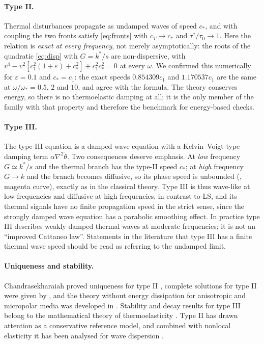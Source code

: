 \paragraph{Type II.} Thermal disturbances propagate as undamped waves of speed $c_*$, and with coupling the two fronts satisfy \eqref{eq:fronts} with $c_T\to c_*$ and $\tau^\dagger/\tau_0\to1$. Here the relation is \emph{exact at every frequency}, not merely asymptotically: the roots of the quadratic \eqref{eq:disp} with $G=k^*/s$ are non-dispersive, with $v^4-v^2[c_1^2(1+\varepsilon)+c_*^2]+c_1^2c_*^2=0$ at every $\omega$. We confirmed this numerically for $\varepsilon=0.1$ and $c_*=c_1$: the exact speeds $0.854309c_1$ and $1.170537c_1$ are the same at $\omega/\omega_*=0.5$, $2$ and $10$, and agree with the formula. The theory conserves energy, so there is no thermoelastic damping at all; it is the only member of the family with that property and therefore the benchmark for energy-based checks.
\paragraph{Type III.} The type III equation is a damped wave equation with a Kelvin--Voigt-type damping term $\alpha\nabla^2\dot\theta$. Two consequences deserve emphasis. At \emph{low} frequency $G\simeq k^*/s$ and the thermal branch has the type-II speed $c_*$; at \emph{high} frequency $G\to k$ and the branch becomes diffusive, so its phase speed is unbounded (, magenta curve), exactly as in the classical theory. Type III is thus wave-like at low frequencies and diffusive at high frequencies, in contrast to LS, and its thermal signals have no finite propagation speed in the strict sense, since the strongly damped wave equation has a parabolic smoothing effect. In practice type III describes weakly damped thermal waves at moderate frequencies; it is not an ``improved Cattaneo law''. Statements in the literature that type III has a finite thermal wave speed should be read as referring to the undamped limit.
\paragraph{Uniqueness and stability.} Chandrasekharaiah proved uniqueness for type II \citep{Chandrasekharaiah1996}, complete solutions for type II were given by \citep{Chandrasekharaiah1997}, and the theory without energy dissipation for anisotropic and micropolar media was developed in \citep{Iesan1998,Quintanilla1999,Ciarletta1999,Quintanilla2002}. Stability and decay results for type III belong to the mathematical theory of thermoelasticity \citep{Suh1998}. Type II has drawn attention as a conservative reference model, and combined with nonlocal elasticity it has been analysed for wave dispersion \citep{Sarkar2019}.

